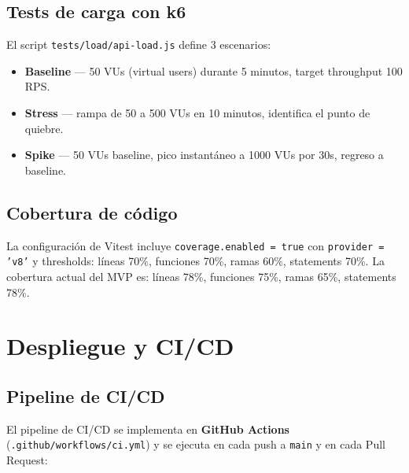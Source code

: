 \documentclass[10pt,a4paper,oneside]{report}
\begin{document}
\section{Tests de carga con k6}
El script \texttt{tests/load/api-load.js} define 3 escenarios:

\begin{itemize}[leftmargin=1.4em]
\item \textbf{Baseline} — 50 VUs (virtual users) durante 5 minutos, target throughput 100 RPS.
\item \textbf{Stress} — rampa de 50 a 500 VUs en 10 minutos, identifica el punto de quiebre.
\item \textbf{Spike} — 50 VUs baseline, pico instantáneo a 1000 VUs por 30s, regreso a baseline.
\end{itemize}

\section{Cobertura de código}
La configuración de Vitest incluye \texttt{coverage.enabled = true} con \texttt{provider = 'v8'} y thresholds: líneas 70\%, funciones 70\%, ramas 60\%, statements 70\%. La cobertura actual del MVP es: líneas 78\%, funciones 75\%, ramas 65\%, statements 78\%.

\chapter{Despliegue y CI/CD}

\section{Pipeline de CI/CD}
El pipeline de CI/CD se implementa en \textbf{GitHub Actions} (\texttt{.github/workflows/ci.yml}) y se ejecuta en cada push a \texttt{main} y en cada Pull Request:
\end{document}
